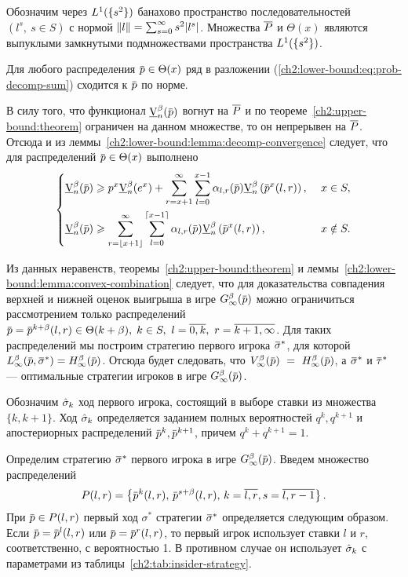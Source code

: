 Обозначим через $L^1(\{s^2\})$ банахово пространство последовательностей $(l^s,\ s \in S)$ с нормой $\left\lVert l\right\rVert = \sum_{s = 0}^\infty s^2 |l^s|$.
Множества $\overline{P}$ и $\Theta(x)$ являются выпуклыми замкнутыми подмножествами пространства $L^1(\{s^2\})$.

\begin{lemma}
  \label{ch2:lower-bound:lemma:decomp-convergence}
  Для любого распределения $\p \in \Theta(x)$ ряд в разложении (\ref{ch2:lower-bound:eq:prob-decomp-sum}) сходится к $\p$ по норме.
\end{lemma}

В силу того, что функционал $\LowV(\p)$ вогнут на $\overline{P}$ и по теореме~\ref{ch2:upper-bound:theorem} ограничен на данном множестве, то он непрерывен на $\overline{P}$.
Отсюда и из леммы~\ref{ch2:lower-bound:lemma:decomp-convergence} следует, что для распределений $\p \in \Theta(x)$ выполнено
\begin{equation*}
  \left\{
  \begin{aligned}
    \LowV(\p) &\geqslant
      p^x \LowV(e^x) + \sum_{r=x+1}^\infty \sum_{l=0}^{x-1} \alpha_{l,r}(\p) \LowV \left( \p^x(l, r) \right),&\ x \in S,\\
    \LowV(\p) &\geqslant 
      \sum_{r=\floor{x+1}}^\infty \sum_{l=0}^{\ceil{x-1}} \alpha_{l,r}(\p) \LowV \left( \p^x(l, r) \right),&\ x \notin S.
  \end{aligned}
  \right.
\end{equation*}

Из данных неравенств, теоремы~\ref{ch2:upper-bound:theorem} и леммы~\ref{ch2:lower-bound:lemma:convex-combination} следует, что для доказательства совпадения верхней и нижней оценок выигрыша в игре $\theG[\infty](\p)$ можно ограничиться рассмотрением только распределений %
$\p = \p^{k+\beta}(l, r) \in \Theta(k + \beta), \; k \in S,\ l = \overline{0, k},\ r = \overline{k+1, \infty}$.
Для таких распределений мы построим стратегию первого игрока $\sigmav^*$, для которой $\Low[\infty](\p, \sigmav^*) = \High[\infty](\p)$.
Отсюда будет следовать, что $\V[\infty](\p)~=~\High[\infty](\p)$, а $\sigmav^*$ и $\tauv^*$ --- оптимальные стратегии игроков в игре $\theG[\infty](\p)$.

Обозначим $\hat{\sigma}_k$ ход первого игрока, состоящий в выборе ставки из множества $\{k, k+1\}$.
Ход $\hat{\sigma}_k$ определяется заданием полных вероятностей $q^k, q^{k+1}$ и апостериорных распределений $\p^k, \p^{k+1}$, причем $q^k + q^{k+1} = 1$.

Определим стратегию $\sigmav^*$ первого игрока в игре $\theG[\infty](\p)$.
Введем множество распределений
\begin{equation*}
  P(l,r) = \left\{
    \p^k(l, r), \, \p^{s+\beta}(l, r), \, k = \overline{l,r}, s = \overline{l,r-1}
  \right\}.
\end{equation*}
При $\p \in P(l,r)$ первый ход $\sigma^*$ стратегии $\sigmav^*$ определяется следующим образом.
Если $\p = \p^l(l,r)$ или $\p = \p^r(l,r)$, то первый игрок использует ставки $l$ и $r$, соответственно, с вероятностью 1.
В противном случае он использует $\hat{\sigma}_k$ с параметрами из таблицы~\ref{ch2:tab:insider-strategy}.

